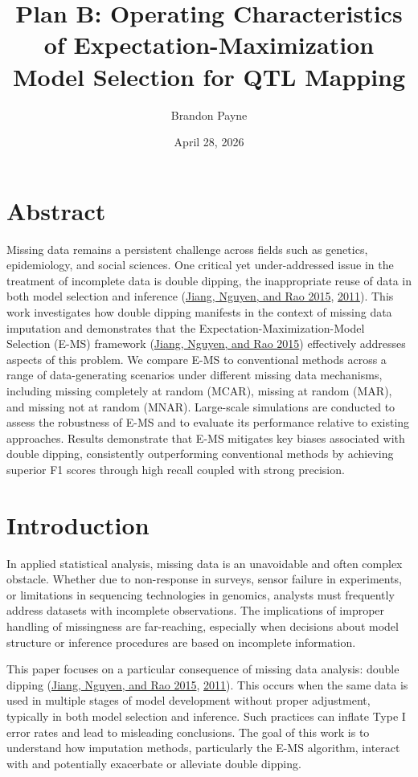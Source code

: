 \documentclass[
  12pt,
]{article}
\title{Plan B: Operating Characteristics of Expectation-Maximization Model Selection for QTL Mapping}
\subtitle{A THESIS SUBMITTED IN PARTIAL FULFILLMENT OF THE REQUIREMENTS
FOR THE DEGREE OF MASTER OF PUBLIC HEALTH DATA SCIENCE

Committee:

Dr.~J. Sunil Rao (Plan B Advisor) 

Dr.~Lynn Eberly (Academic
Advisor) 

Dr.~Weihong Tang}
\author{Brandon Payne}
\date{April 28, 2026}
\begin{document}
\maketitle

\newpage

\hypertarget{abstract}{%
\section*{Abstract}\label{abstract}}

Missing data remains a persistent challenge across fields such as
genetics, epidemiology, and social sciences. One critical yet
under-addressed issue in the treatment of incomplete data is double
dipping, the inappropriate reuse of data in both model selection and
inference (\protect\hyperlink{ref-Sunilems}{Jiang, Nguyen, and Rao
2015}, \protect\hyperlink{ref-jiang2011best}{2011}). This work
investigates how double dipping manifests in the context of missing data
imputation and demonstrates that the Expectation-Maximization-Model
Selection (E-MS) framework (\protect\hyperlink{ref-Sunilems}{Jiang,
Nguyen, and Rao 2015}) effectively addresses aspects of this problem.
We compare E-MS to conventional methods across a range of
data-generating scenarios under different missing data mechanisms,
including missing completely at random (MCAR), missing at random (MAR),
and missing not at random (MNAR). Large-scale simulations are conducted
to assess the robustness of E-MS and to evaluate its performance
relative to existing approaches. Results demonstrate that E-MS mitigates
key biases associated with double dipping, consistently outperforming
conventional methods by achieving superior F1 scores through high recall
coupled with strong precision.

\section{Introduction}

In applied statistical analysis, missing data is an unavoidable and
often complex obstacle. Whether due to non-response in surveys, sensor
failure in experiments, or limitations in sequencing technologies in
genomics, analysts must frequently address datasets with incomplete
observations. The implications of improper handling of missingness are
far-reaching, especially when decisions about model structure or
inference procedures are based on incomplete information.

This paper focuses on a particular consequence of missing data analysis:
double dipping (\protect\hyperlink{ref-Sunilems}{Jiang, Nguyen, and Rao
2015}, \protect\hyperlink{ref-jiang2011best}{2011}). This occurs when
the same data is used in multiple stages of model development without
proper adjustment, typically in both model selection and inference. Such
practices can inflate Type I error rates and lead to misleading
conclusions. The goal of this work is to understand how imputation
methods, particularly the E-MS algorithm, interact with and potentially
exacerbate or alleviate double dipping.
\end{document}
